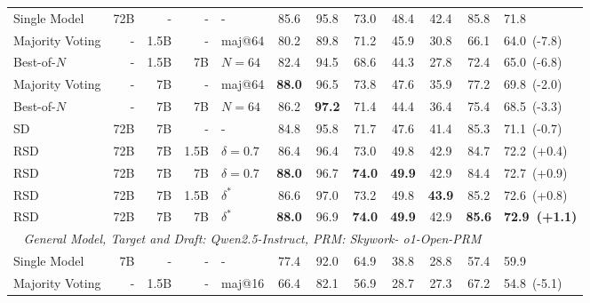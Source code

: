 \documentclass{article}
\theoremstyle{plain}
\theoremstyle{definition}
\theoremstyle{remark}
\begin{document}
\begin{table}[h!]
\begin{center}
\begin{tabular}{lrrrlccccccl}
\midrule
Single Model & 72B & - & - & - & 85.6 & 95.8 & 73.0 & 48.4 & 42.4 & 85.8 & 71.8 \\
\cmidrule(lr){1-12}
Majority Voting & - & 1.5B & - & maj@64 & 80.2 & 89.8 & 71.2 & 45.9 & 30.8 & 66.1 & 64.0~(-7.8) \\
Best-of-$N$ & - & 1.5B & 7B & $N=64$ & 82.4 & 94.5 & 68.6 & 44.3 & 27.8 & 72.4 & 65.0~(-6.8) \\
Majority Voting & - & 7B & - & maj@64 & \textbf{88.0} & 96.5 & 73.8 & 47.6 & 35.9 & 77.2 & 69.8~(-2.0) \\
Best-of-$N$ & - & 7B & 7B & $N=64$ & 86.2 & \textbf{97.2} & 71.4 & 44.4 & 36.4 & 75.4 & 68.5~(-3.3) \\
SD & 72B & 7B & - & - & 84.8 & 95.8 & 71.7 & 47.6 & 41.4 & 85.3 & 71.1~(-0.7) \\
\rowcolor{blue!8}
RSD & 72B & 7B & 1.5B & $\delta=0.7$ & 86.4 & 96.4 & 73.0 & 49.8 & 42.9 & 84.7 & 72.2~(+0.4) \\
\rowcolor{blue!8}
RSD & 72B & 7B & 7B & $\delta=0.7$ & \textbf{88.0} & 96.7 & \textbf{74.0} & \textbf{49.9} & 42.9 & 84.4 & 72.7~(+0.9) \\
\rowcolor{orange!8}
RSD & 72B & 7B & 1.5B  & $\delta^*$ & 86.6 & 97.0 & 73.2 & 49.8 & \textbf{43.9} & 85.2 & 72.6~(+0.8) \\
\rowcolor{orange!8}
RSD & 72B & 7B & 7B  & $\delta^*$ & \textbf{88.0} & 96.9 & \textbf{74.0} & \textbf{49.9} & 42.9 & \textbf{85.6} & \textbf{72.9~(+1.1)} \\
\midrule
\multicolumn{11}{c}{\textit{General Model, Target and Draft: Qwen2.5-Instruct, PRM: Skywork-
o1-Open-PRM}} \\
\midrule
Single Model & 7B & - & - & - & 77.4 & 92.0 & 64.9 & 38.8 & 28.8 & 57.4 & 59.9 \\
\cmidrule(lr){1-12}
Majority Voting & - & 1.5B & - & maj@16 & 66.4 & 82.1 & 56.9 & 28.7 & 27.3 & 67.2 & 54.8~(-5.1) \\

\end{tabular}
\end{center}
\end{table}
\end{document}
